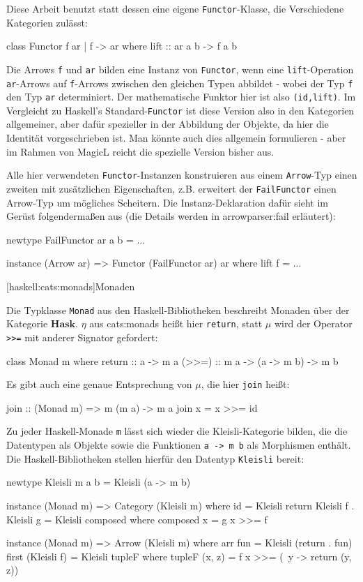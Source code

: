 \documentclass[11pt, a4paper, bibgerm]{book}
\newcommand\icode[1]{\lstinline?#1?}
\newcommand\lsubsection{}
\newcommand\sref{}
\begin{document}
Diese Arbeit benutzt statt dessen eine eigene \icode{Functor}-Klasse,
die Verschiedene Kategorien zulässt:
\begin{code}
class Functor f ar | f -> ar where
  lift :: ar a b -> f a b
\end{code}
Die Arrows \icode{f} und \icode{ar} bilden eine Instanz von
\icode{Functor}, wenn eine \icode{lift}-Operation \icode{ar}-Arrows auf
\icode{f}-Arrows zwischen den gleichen Typen abbildet - wobei der Typ
\icode{f} den Typ \icode{ar} determiniert. Der mathematische Funktor
hier ist also \icode{(id,lift)}. Im Vergleicht zu Haskell's
Standard-\icode{Functor} ist diese Version also in den Kategorien
allgemeiner, aber dafür spezieller in der Abbildung der Objekte, da hier
die Identität vorgeschrieben ist. Man könnte auch dies allgemein
formulieren - aber im Rahmen von MagicL reicht die spezielle Version
bisher aus.

Alle hier verwendeten \icode{Functor}-Instanzen konstruieren aus einem
\icode{Arrow}-Typ einen zweiten mit zusätzlichen Eigenschaften,
z.B. erweitert der \icode{FailFunctor} einen Arrow-Typ um mögliches
Scheitern. Die Instanz-Deklaration dafür sieht im Gerüst folgendermaßen
aus (die Details werden in \sref{arrowparser:fail} erläutert):
\begin{code}
newtype FailFunctor ar a b = ...

instance (Arrow ar) => Functor (FailFunctor ar) ar where
  lift f = ...
\end{code}

\lsubsection[haskell:cats:monads]{Monaden}

Die Typklasse \icode{Monad} aus den Haskell-Bibliotheken beschreibt
Monaden über der Kategorie $\mathbf{Hask}$. $\eta$ aus
\sref{cats:monads} heißt hier \icode{return}, statt $\mu$ wird der
Operator \icode{>>=} %
mit anderer Signator gefordert:
\begin{code}
class Monad m where
  return :: a -> m a
  (>>=)  :: m a -> (a -> m b) -> m b
\end{code} %
Es gibt auch eine genaue Entsprechung von $\mu$, die hier \icode{join}
heißt:
\begin{code}
join :: (Monad m) => m (m a) -> m a
join x = x >>= id
\end{code} %

Zu jeder Haskell-Monade \icode{m} lässt sich wieder die
Kleisli-Kategorie bilden, die die Datentypen als Objekte sowie die
Funktionen \icode{a -> m b} als Morphismen enthält. Die
Haskell-Bibliotheken stellen hierfür den Datentyp \icode{Kleisli}
bereit:
\begin{code}
newtype Kleisli m a b = Kleisli (a -> m b)

instance (Monad m) => Category (Kleisli m)
  where id = Kleisli return
        Kleisli f . Kleisli g = Kleisli composed
          where composed x = g x >>= f

instance (Monad m) => Arrow (Kleisli m)
  where arr fun = Kleisli (return . fun)
        first (Kleisli f) = Kleisli tupleF
          where tupleF (x, z) = f x >>= (\ y -> return (y, z))
\end{code} %
\end{document}
